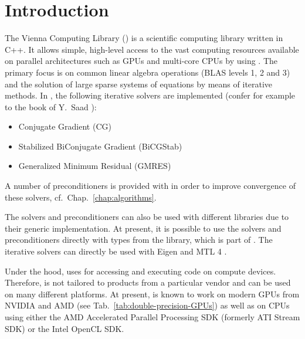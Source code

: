 
\chapter*{Introduction}   

The Vienna Computing Library (\ViennaCL) is a scientific computing
library written in C++. It allows simple, high-level access
to the vast computing resources available on parallel architectures such as
GPUs and multi-core CPUs by using {\OpenCL}. The primary focus is on common linear algebra
operations (BLAS levels 1, 2 and 3) and the solution of large sparse systems of equations by means of iterative
methods. In {\ViennaCLminorversion}, the following iterative solvers are
implemented (confer for example to the book of Y.~Saad \cite{saad-iterative-solution}):
\begin{itemize}
 \item Conjugate Gradient (CG)
 \item Stabilized BiConjugate Gradient (BiCGStab)
 \item Generalized Minimum Residual (GMRES)
\end{itemize}
A number of preconditioners is provided with {\ViennaCLversion} in order to improve convergence of these solvers, cf.~Chap.~\ref{chap:algorithms}.

The solvers and preconditioners can also be used with different
libraries due to their generic implementation. At present, it is possible to
use the solvers and preconditioners directly with types from the {\ublas} library, which is part of 
{\Boost} \cite{boost}. The iterative solvers can directly be used with Eigen \cite{eigen} and MTL 4 \cite{mtl4}.

Under the hood, {\ViennaCL} uses {\OpenCL} \cite{khronoscl} for accessing and
executing code on compute devices. Therefore, {\ViennaCL} is not tailored 
to products from a particular vendor and can be used on many different
platforms. At present, {\ViennaCL} is known to work on modern GPUs from {NVIDIA}
and AMD (see Tab.~\ref{tab:double-precision-GPUs}) as well as on CPUs 
using either the AMD Accelerated Parallel Processing SDK (formerly ATI Stream SDK) or the Intel OpenCL SDK.


